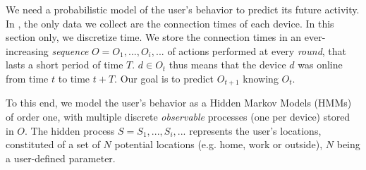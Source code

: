 We need a probabilistic model of the user's behavior to predict its future activity.
In \name, the only data we collect are the connection times of each device.
In this section only, we discretize time. 
We store the connection times in an ever-increasing \emph{sequence} $O=O_1, ..., O_i, ...$ of actions performed at every \emph{round}, that lasts a short period of time $T$. 
$d \in O_t$ thus means that the device $d$ was online from time $t$ to time $t+T$.
Our goal is to predict $O_{t+1}$ knowing $O_t$.

To this end, we model the user's behavior as a Hidden Markov Models (HMMs) of order one, with multiple discrete \emph{observable} processes (one per device) stored in $O$. 
The hidden process $S=S_1, ..., S_i, ...$ represents the user's locations, constituted of a set of $N$ potential locations (e.g. home, work or outside), $N$ being a user-defined parameter.








